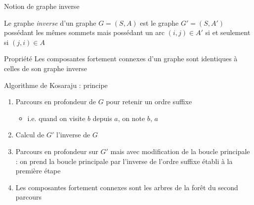 \begin{frame}{Notion de graphe inverse}
\begin{definition}
    Le graphe \emph{inverse} d'un graphe $G=(S,A)$ est le graphe $G'=(S,A')$ possédant les mêmes sommets mais possédant un arc $(i,j) \in A'$ si et seulement si $(j,i) \in A$    
\end{definition}

\begin{example}
\end{example}

\begin{block}{Propriété}
    Les composantes fortement connexes d'un graphe sont identiques à celles de son graphe inverse
\end{block}

\end{frame}

\begin{frame}{Algorithme de Kosaraju : principe}

\begin{enumerate}
    \item Parcours en profondeur de $G$ pour retenir un ordre suffixe
    \begin{itemize}
        \item i.e. quand on visite $b$ depuis $a$, on note $b$, $a$
    \end{itemize}
    \item Calcul de $G'$ l'inverse de $G$
    \item Parcours en profondeur sur $G'$ mais avec modification de la boucle principale : on prend la boucle principale par l'inverse de l'ordre suffixe établi à la première étape
    \item Les composantes fortement connexes sont les arbres de la forêt du second parcours
\end{enumerate}

\end{frame}

